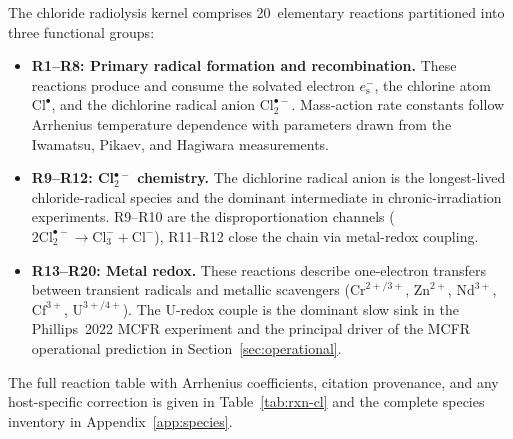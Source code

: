 \documentclass[11pt]{article}
\theoremstyle{plain}
\theoremstyle{definition}
\theoremstyle{remark}
\newcommand{\eS}{\ensuremath{e_{\mathrm{s}}^{-}}\xspace}
\newcommand{\Clt}{\ensuremath{\mathrm{Cl}_2^{\bullet-}}\xspace}
\begin{document}
The chloride radiolysis kernel comprises 20~elementary reactions partitioned
into three functional groups:

\begin{itemize}
\item \textbf{R1--R8: Primary radical formation and recombination.}
      These reactions produce and consume the solvated electron \eS, the
      chlorine atom $\mathrm{Cl}^{\bullet}$, and the dichlorine radical anion
      \Clt.  Mass-action rate constants follow Arrhenius temperature
      dependence with parameters drawn from the Iwamatsu, Pikaev, and
      Hagiwara measurements.
\item \textbf{R9--R12: Cl$_2^{\bullet-}$ chemistry.}
      The dichlorine radical anion is the longest-lived chloride-radical
      species and the dominant intermediate in chronic-irradiation
      experiments.  R9--R10 are the disproportionation channels
      ($2\Clt \to \mathrm{Cl}_3^- + \mathrm{Cl}^-$), R11--R12 close the
      chain via metal-redox coupling.
\item \textbf{R13--R20: Metal redox.}
      These reactions describe one-electron transfers between transient
      radicals and metallic scavengers ($\mathrm{Cr}^{2+/3+}$,
      $\mathrm{Zn}^{2+}$, $\mathrm{Nd}^{3+}$, $\mathrm{Cf}^{3+}$,
      $\mathrm{U}^{3+/4+}$).  The U-redox couple is the dominant slow sink
      in the Phillips~2022 MCFR experiment and the principal driver of the
      MCFR operational prediction in Section~\ref{sec:operational}.
\end{itemize}

The full reaction table with Arrhenius coefficients, citation provenance,
and any host-specific correction is given in Table~\ref{tab:rxn-cl} and the
complete species inventory in Appendix~\ref{app:species}.
\end{document}

